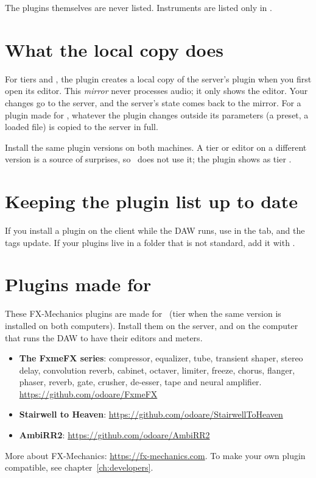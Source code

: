 The  plugins themselves are never listed. Instruments are listed
only in .

\section{What the local copy does}

For tiers  and , the plugin creates a local copy of the
server's plugin when you first open its editor. This \emph{mirror} never
processes audio; it only shows the editor. Your changes go to the server,
and the server's state comes back to the mirror. For a plugin made for
\fxme, whatever the plugin changes outside its parameters (a preset, a loaded
file) is copied to the server in full.

\begin{note}
Install the same plugin versions on both machines. A tier  or
 editor on a different version is a source of surprises, so \fxme\
does not use it; the plugin shows as tier .
\end{note}

\section{Keeping the plugin list up to date}

If you install a plugin on the client while the DAW runs, use  in
the \ui{Settings} tab, and the tags update. If your plugins live in a
folder that is not standard, add it with \ui{Folders\ldots}.

\section{Plugins made for \fxme}
\label{sec:compatible}

These FX-Mechanics plugins are made for \fxme\ (tier  when the same
version is installed on both computers). Install them on the server, and on
the computer that runs the DAW to have their editors and meters.

\begin{itemize}
  \item \textbf{The FxmeFX series}: compressor, equalizer, tube, transient
    shaper, stereo delay, convolution reverb, cabinet, octaver, limiter,
    freeze, chorus, flanger, phaser, reverb, gate, crusher, de-esser, tape
    and neural amplifier.\\
    \url{https://github.com/odoare/FxmeFX}
  \item \textbf{Stairwell to Heaven}:
    \url{https://github.com/odoare/StairwellToHeaven}
  \item \textbf{AmbiRR2}:
    \url{https://github.com/odoare/AmbiRR2}
\end{itemize}

More about FX-Mechanics: \url{https://fx-mechanics.com}. To make your own
plugin compatible, see chapter~\ref{ch:developers}.

